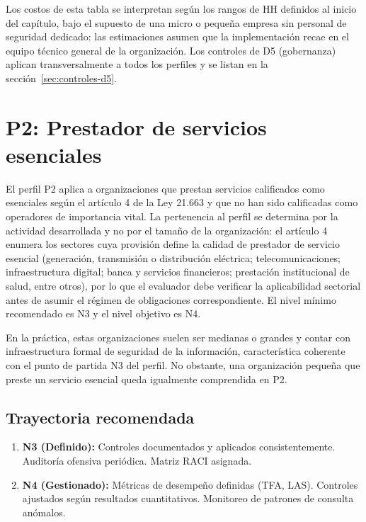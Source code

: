 \begin{infobox}
  Los costos de esta tabla se interpretan según los rangos de HH definidos al inicio del capítulo, bajo el supuesto de una micro o pequeña empresa sin personal de seguridad dedicado: las estimaciones asumen que la implementación recae en el equipo técnico general de la organización. Los controles de D5 (gobernanza) aplican transversalmente a todos los perfiles y se listan en la sección~\ref{sec:controles-d5}.
\end{infobox}

\section{P2: Prestador de servicios esenciales}
\label{sec:perfil-p2}

El perfil P2 aplica a organizaciones que prestan servicios calificados como esenciales según el artículo 4 de la Ley 21.663 y que no han sido calificadas como operadores de importancia vital. La pertenencia al perfil se determina por la actividad desarrollada y no por el tamaño de la organización: el artículo 4 enumera los sectores cuya provisión define la calidad de prestador de servicio esencial (generación, transmisión o distribución eléctrica; telecomunicaciones; infraestructura digital; banca y servicios financieros; prestación institucional de salud, entre otros), por lo que el evaluador debe verificar la aplicabilidad sectorial antes de asumir el régimen de obligaciones correspondiente. El nivel mínimo recomendado es N3 y el nivel objetivo es N4.

En la práctica, estas organizaciones suelen ser medianas o grandes y contar con infraestructura formal de seguridad de la información, característica coherente con el punto de partida N3 del perfil. No obstante, una organización pequeña que preste un servicio esencial queda igualmente comprendida en P2.

\subsection{Trayectoria recomendada}

\begin{enumerate}[leftmargin=2em]
  \item \textbf{N3 (Definido):} Controles documentados y aplicados consistentemente. Auditoría ofensiva periódica. Matriz RACI asignada.
  \item \textbf{N4 (Gestionado):} Métricas de desempeño definidas (TFA, LAS). Controles ajustados según resultados cuantitativos. Monitoreo de patrones de consulta anómalos.
\end{enumerate}

